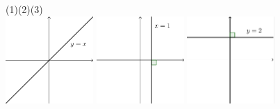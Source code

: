 \documentclass{oblivoir}
\begin{document}
%
\label{various10}
\begin{center}
(1)\hspace{100pt}(2)\hspace{100pt}(3)\\
\includegraphics[width=0.25\textwidth]{various_10-1}\qquad
\includegraphics[width=0.25\textwidth]{various_10-2}\qquad
\includegraphics[width=0.25\textwidth]{various_10-3}
\end{center}



\end{document}
